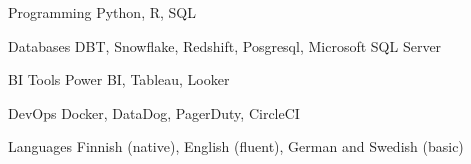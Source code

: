

\begin{cvskills}

  \cvskill
    {Programming} %
    {Python, R, SQL} %

  \cvskill
    {Databases} %
    {DBT, Snowflake, Redshift, Posgresql, Microsoft SQL Server} %

  \cvskill
    {BI Tools} %
    {Power BI, Tableau, Looker} %

  \cvskill
    {DevOps} %
    {Docker, DataDog, PagerDuty, CircleCI} %

  \cvskill
    {Languages} %
    {Finnish (native), English (fluent), German and Swedish (basic)} %

\end{cvskills}
